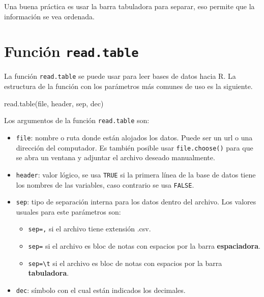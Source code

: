 \documentclass[
]{book}
\makeatletter
\newenvironment{Shaded}{\begin{snugshade}}{\end{snugshade}}
\newcommand{\FunctionTok}[1]{\textcolor[rgb]{0.00,0.00,0.00}{#1}}
\newcommand{\NormalTok}[1]{#1}
\providecommand{\tightlist}{%
  \setlength{\itemsep}{0pt}\setlength{\parskip}{0pt}}
\newenvironment{kframe}{%
\medskip{}
\setlength{\fboxsep}{.8em}
 \def\at@end@of@kframe{}%
 \ifinner\ifhmode%
  \def\at@end@of@kframe{\end{minipage}}%
  \begin{minipage}{\columnwidth}%
 \fi\fi%
 \def\FrameCommand##1{\hskip\@totalleftmargin \hskip-\fboxsep
 \colorbox{shadecolor}{##1}\hskip-\fboxsep
     \hskip-\linewidth \hskip-\@totalleftmargin \hskip\columnwidth}%
 \MakeFramed {\advance\hsize-\width
   \@totalleftmargin\z@ \linewidth\hsize
   \@setminipage}}%
 {\par\unskip\endMakeFramed%
 \at@end@of@kframe}
\renewenvironment{Shaded}{\begin{kframe}}{\end{kframe}}
\newenvironment{rmdblock}[1]
  {
  \begin{itemize}
  \renewcommand{\labelitemi}{
    \raisebox{-.7\height}[0pt][0pt]{
      {\setkeys{Gin}{width=3em,keepaspectratio}\texttt{[image: images/\#1]}}
    }
  }
  \setlength{\fboxsep}{1em}
  \begin{kframe}
  \item
  }
  {
  \end{kframe}
  \end{itemize}
  }
\newenvironment{rmdtip}
  {\begin{rmdblock}{tip}}
  {\end{rmdblock}}
\makeatother
\begin{document}
\begin{rmdtip}
Una buena práctica es usar la barra tabuladora para separar, eso permite que la información se vea ordenada.
\end{rmdtip}

\hypertarget{funciuxf3n-read.table}{%
\section{\texorpdfstring{Función \texttt{read.table}}{Función read.table}}\label{funciuxf3n-read.table}}

La función \texttt{read.table} se puede usar para leer bases de datos hacia R. La estructura de la función con los parámetros más comunes de uso es la siguiente.

\begin{Shaded}
\begin{Highlighting}[]
\FunctionTok{read.table}\NormalTok{(file, header, sep, dec)}
\end{Highlighting}
\end{Shaded}

Los argumentos de la función \texttt{read.table} son:

\begin{itemize}
\tightlist
\item
  \texttt{file}: nombre o ruta donde están alojados los datos. Puede ser un url o una dirección del computador. Es también posible usar \texttt{file.choose()} para que se abra un ventana y adjuntar el archivo deseado manualmente.
\item
  \texttt{header}: valor lógico, se usa \texttt{TRUE} si la primera línea de la base de datos tiene los nombres de las variables, caso contrario se usa \texttt{FALSE}.
\item
  \texttt{sep}: tipo de separación interna para los datos dentro del archivo. Los valores usuales para este parámetros son:

  \begin{itemize}
  \tightlist
  \item
    \texttt{sep=\textquotesingle{},\textquotesingle{}} si el archivo tiene extensión .csv.
  \item
    \texttt{sep=\textquotesingle{}\textquotesingle{}} si el archivo es bloc de notas con espacios por la barra \textbf{espaciadora}.
  \item
    \texttt{sep=\textquotesingle{}\textbackslash{}t\textquotesingle{}} si el archivo es bloc de notas con espacios por la barra \textbf{tabuladora}.
  \end{itemize}
\item
  \texttt{dec}: símbolo con el cual están indicados los decimales.
\end{itemize}
\end{document}
